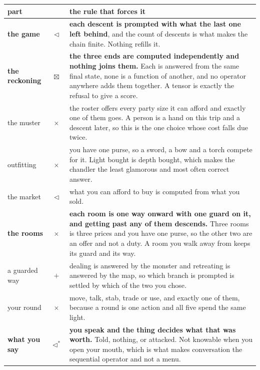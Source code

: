 \documentclass[11pt,a4paper]{article}
\newcommand{\seqb}{\lhd^{\ast}}
\begin{document}
\small
\begin{center}
\begin{tabular}{@{}l@{\hspace{5mm}}c@{\hspace{5mm}}>{\raggedright\arraybackslash}p{}@{}}
\toprule
\textbf{part} & & \textbf{the rule that forces it} \\
\midrule
\textbf{the game} & $\lhd$     & \textbf{each descent is prompted with what the last one left behind}, and the count of descents is what makes the chain finite. Nothing refills it. \\
\textbf{the reckoning}& $\boxtimes$ & \textbf{the three ends are computed independently and nothing joins them.} Each is answered from the same final state, none is a function of another, and no operator anywhere adds them together. A tensor is exactly the refusal to give a score. \\
the muster        & $\times$   & the roster offers every party size it can afford and exactly one of them goes. A person is a hand on this trip and a descent later, so this is the one choice whose cost falls due twice. \\
outfitting        & $\times$   & you have one purse, so a sword, a bow and a torch compete for it. Light bought is depth bought, which makes the chandler the least glamorous and most often correct answer. \\
the market        & $\lhd$     & what you can afford to buy is computed from what you sold. \\
\textbf{the rooms}& $\times$   & \textbf{each room is one way onward with one guard on it, and getting past any of them descends.} Three rooms is three prices and you have one purse, so the other two are an offer and not a duty. A room you walk away from keeps its guard and its way. \\
a guarded way     & $+$        & dealing is answered by the monster and retreating is answered by the map, so which branch is prompted is settled by which of the two you chose. \\
your round        & $\times$   & move, talk, stab, trade or use, and exactly one of them, because a round is one action and all five spend the same light. \\
\textbf{what you say}& $\seqb$    & \textbf{you speak and the thing decides what that was worth.} Told, nothing, or attacked. Not knowable when you open your mouth, which is what makes conversation the sequential operator and not a menu. \\
\bottomrule
\end{tabular}
\end{center}
\end{document}
